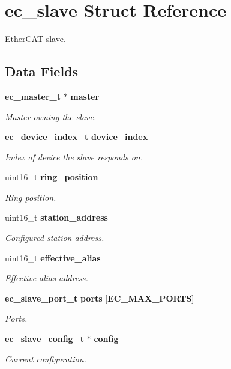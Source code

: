 \section{ec\-\_\-slave \-Struct \-Reference}
\label{structec__slave}


\-Ether\-C\-A\-T slave.  


\subsection*{\-Data \-Fields}
\begin{DoxyCompactItemize}
\item 
{\bf ec\-\_\-master\-\_\-t} $\ast$ {\bf master}
\begin{DoxyCompactList}\small\item\em \-Master owning the slave. \end{DoxyCompactList}\item 
{\bf ec\-\_\-device\-\_\-index\-\_\-t} {\bf device\-\_\-index}
\begin{DoxyCompactList}\small\item\em \-Index of device the slave responds on. \end{DoxyCompactList}\item 
uint16\-\_\-t {\bf ring\-\_\-position}
\begin{DoxyCompactList}\small\item\em \-Ring position. \end{DoxyCompactList}\item 
uint16\-\_\-t {\bf station\-\_\-address}
\begin{DoxyCompactList}\small\item\em \-Configured station address. \end{DoxyCompactList}\item 
uint16\-\_\-t {\bf effective\-\_\-alias}
\begin{DoxyCompactList}\small\item\em \-Effective alias address. \end{DoxyCompactList}\item 
{\bf ec\-\_\-slave\-\_\-port\-\_\-t} {\bf ports} [{\bf \-E\-C\-\_\-\-M\-A\-X\-\_\-\-P\-O\-R\-T\-S}]
\begin{DoxyCompactList}\small\item\em \-Ports. \end{DoxyCompactList}\item 
{\bf ec\-\_\-slave\-\_\-config\-\_\-t} $\ast$ {\bf config}
\begin{DoxyCompactList}\small\item\em \-Current configuration. \end{DoxyCompactList}\item 

\end{DoxyCompactItemize}
